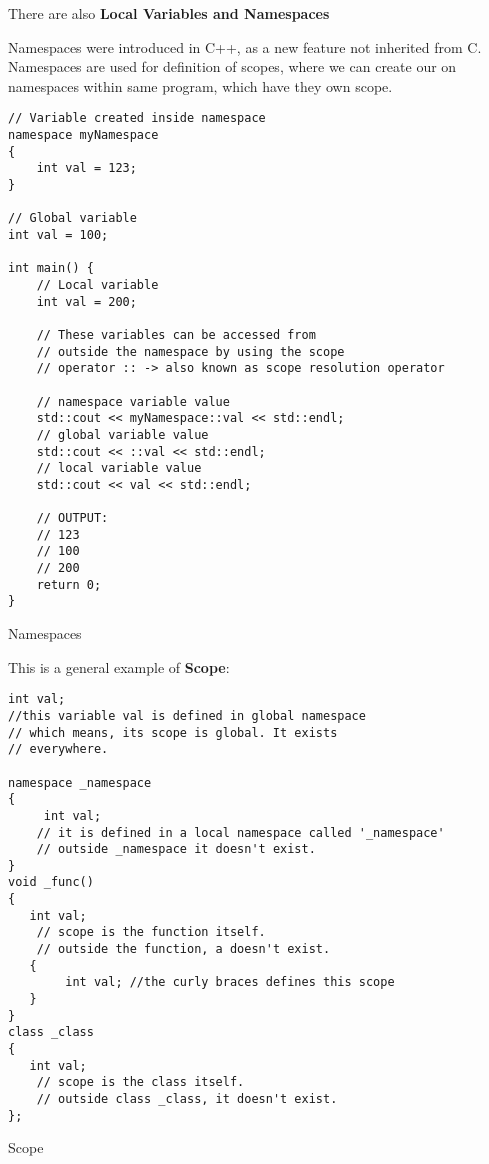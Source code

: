 \documentclass[11pt, a4paper]{article}
\begin{document}
There are also \textbf{Local Variables and Namespaces}



Namespaces were introduced in C++, as a new feature not inherited from C. Namespaces are used for definition of scopes, where we can create our on namespaces within same program, which have they own scope.


\begin{listing}
\begin{verbatim}
// Variable created inside namespace
namespace myNamespace
{ 
    int val = 123;
} 

// Global variable
int val = 100;

int main() {
    // Local variable
    int val = 200;

    // These variables can be accessed from
    // outside the namespace by using the scope
    // operator :: -> also known as scope resolution operator

    // namespace variable value
    std::cout << myNamespace::val << std::endl;
    // global variable value
    std::cout << ::val << std::endl;
    // local variable value
    std::cout << val << std::endl;

    // OUTPUT:
    // 123
    // 100
    // 200
    return 0;
}
\end{verbatim}
\caption{Namespaces}
\label{lst:namespaces}
\end{listing}





This is a general example of \textbf{Scope}:


\begin{listing}
\begin{verbatim}
int val;
//this variable val is defined in global namespace
// which means, its scope is global. It exists
// everywhere.

namespace _namespace
{
     int val;  
    // it is defined in a local namespace called '_namespace'
    // outside _namespace it doesn't exist.
}
void _func()
{
   int val;  
    // scope is the function itself.
    // outside the function, a doesn't exist.
   {
        int val; //the curly braces defines this scope
   }
}
class _class
{
   int val;  
    // scope is the class itself.
    // outside class _class, it doesn't exist.
};
\end{verbatim}
\caption{Scope}
\label{lst:scope}
\end{listing}
\end{document}
